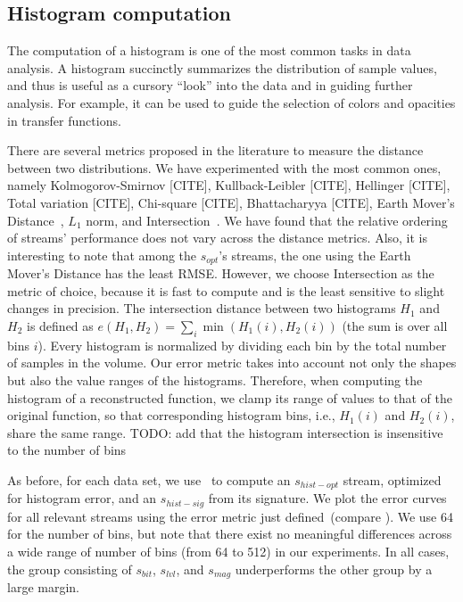 \subsection{Histogram computation}\label{sec:histogram}

The computation of a histogram is one of the most common tasks in data analysis. A histogram
succinctly summarizes the distribution of sample values, and thus is useful as a cursory ``look''
into the data and in guiding further analysis. For example, it can be used to guide the selection
of colors and opacities in transfer functions.

There are several metrics proposed in the literature to measure the distance between two
distributions. We have experimented with the most common ones, namely Kolmogorov-Smirnov [CITE],
Kullback-Leibler [CITE], Hellinger [CITE], Total variation [CITE], Chi-square [CITE], Bhattacharyya
[CITE], Earth Mover's Distance~\cite{emd1998}, $L_1$ norm, and
Intersection~\cite{histogram_intersection1991}. We have found that the relative ordering of streams'
performance does not vary across the distance metrics. Also, it is interesting to note that among
the $s_{opt}$'s streams, the one using the Earth Mover's Distance has the least RMSE. However, we choose Intersection as the
metric of choice, because it is fast to compute and is the least sensitive to slight changes in
precision. The intersection distance between two histograms $H_1$ and $H_2$ is defined as
$e(H_1,H_2)=\sum_{i}{\min{(H_1(i),H_2(i))}}$ (the sum is over all bins $i$). Every histogram is
normalized by dividing each bin by the total number of samples in the volume. Our error metric takes
into account not only the shapes but also the value ranges of the histograms. Therefore, when computing
the histogram of a reconstructed function, we clamp its range of values to that of the original
function, so that corresponding histogram bins, i.e., $H_1(i)$ and $H_2(i)$, share the same range.
TODO: add that the histogram intersection is insensitive to the number of bins

As before, for each data set, we use~ to compute an $s_{hist-opt}$ stream,
optimized for histogram error, and an $s_{hist-sig}$ from its signature. We plot the error curves
for all relevant streams using the error metric just
defined~(compare ). We use 64 for the number of bins, but note that
there exist no meaningful differences across a wide range of number of bins (from 64 to 512) in our
experiments. In all cases, the group consisting of $s_{bit}$, $s_{lvl}$, and $s_{mag}$ underperforms
the other group by a large margin.

